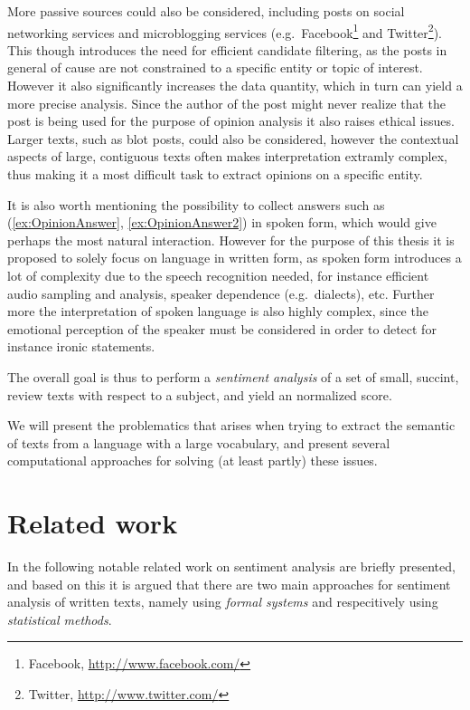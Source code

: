 More passive sources could also be considered, including 
posts on social networking services and microblogging services (e.g.\ Facebook\footnote{Facebook, \url{http://www.facebook.com/}} and Twitter\footnote{Twitter, \url{http://www.twitter.com/}}). This though introduces the need for efficient candidate filtering, as the posts in general of cause are not constrained to a specific entity or topic of interest. However it also significantly increases the data quantity, which in turn can yield a more precise analysis. Since the author of the post might never realize that the post is being used for the purpose of opinion analysis it also raises ethical issues. Larger texts, such as blot posts, could also be considered, however the contextual aspects of large, contiguous texts often makes interpretation extramly complex, thus making it a most difficult task to extract opinions on a specific entity. 

It is also worth mentioning the possibility to collect answers such as (\ref{ex:OpinionAnswer}, \ref{ex:OpinionAnswer2}) in spoken form, which would give perhaps the most natural interaction. However for the purpose of this thesis it is proposed to solely focus on language in written form, as spoken form introduces a lot of complexity due to the speech recognition needed, for instance efficient audio sampling and analysis, speaker dependence (e.g.\ dialects), etc. Further more the interpretation of spoken language is also highly complex, since the emotional perception of the speaker must be considered in order to detect for instance ironic statements.


The overall goal is thus to perform a \emph{sentiment analysis} of a set of small, succint, review texts with respect to a subject, and yield an normalized score.



We will present the problematics that arises when trying to extract the semantic of texts from a language with a large vocabulary, and present several computational approaches for solving (at least partly) these issues.

\clearpage

\section{Related work}
In the following notable related work on sentiment analysis are briefly presented, and based on this it is argued that there are two main approaches for sentiment analysis of written texts, namely using \emph{formal systems} and respecitively using \emph{statistical methods}.

